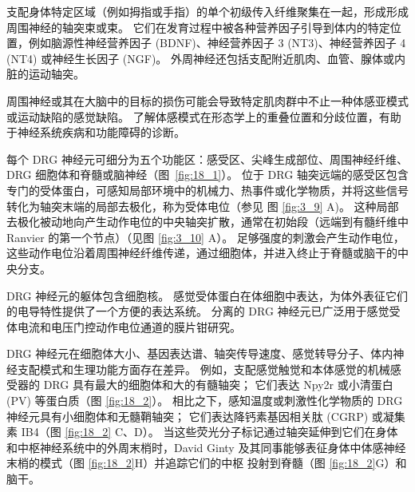 支配身体特定区域（例如拇指或手指）的单个初级传入纤维聚集在一起，形成形成周围神经的轴突束或束。
它们在发育过程中被各种营养因子引导到体内的特定位置，例如脑源性神经营养因子 (BDNF)、神经营养因子 3 (NT3)、神经营养因子 4 (NT4) 或神经生长因子 (NGF)。
外周神经还包括支配附近肌肉、血管、腺体或内脏的运动轴突。


周围神经或其在大脑中的目标的损伤可能会导致特定肌肉群中不止一种体感亚模式或运动缺陷的感觉缺陷。
了解体感模式在形态学上的重叠位置和分歧位置，有助于神经系统疾病和功能障碍的诊断。


每个 DRG 神经元可细分为五个功能区：感受区、尖峰生成部位、周围神经纤维、DRG 细胞体和脊髓或脑神经（图~\ref{fig:18_1}）。 
位于 DRG 轴突远端的感受区包含专门的受体蛋白，可感知局部环境中的机械力、热事件或化学物质，并将这些信号转化为轴突末端的局部去极化，称为受体电位（参见 图 \ref{fig:3_9} A)。 
这种局部去极化被动地向产生动作电位的中央轴突扩散，通常在初始段（远端到有髓纤维中 Ranvier 的第一个节点）（见图 \ref{fig:3_10} A）。 
足够强度的刺激会产生动作电位，这些动作电位沿着周围神经纤维传递，通过细胞体，并进入终止于脊髓或脑干的中央分支。


DRG 神经元的躯体包含细胞核。 
感觉受体蛋白在体细胞中表达，为体外表征它们的电导特性提供了一个方便的表达系统。 
分离的 DRG 神经元已广泛用于感觉受体电流和电压门控动作电位通道的膜片钳研究。


DRG 神经元在细胞体大小、基因表达谱、轴突传导速度、感觉转导分子、体内神经支配模式和生理功能方面存在差异。 
例如，支配感觉触觉和本体感觉的机械感受器的 DRG 具有最大的细胞体和大的有髓轴突； 它们表达 Npy2r 或小清蛋白 (PV) 等蛋白质（图 \ref{fig:18_2}）。 
相比之下，感知温度或刺激性化学物质的 DRG 神经元具有小细胞体和无髓鞘轴突； 它们表达降钙素基因相关肽 (CGRP) 或凝集素 IB4（图 \ref{fig:18_2} C、D）。 
当这些荧光分子标记通过轴突延伸到它们在身体和中枢神经系统中的外周末梢时，David Ginty 及其同事能够表征身体中体感神经末梢的模式（图 \ref{fig:18_2}H）并追踪它们的中枢 投射到脊髓（图 \ref{fig:18_2}G）和脑干。


